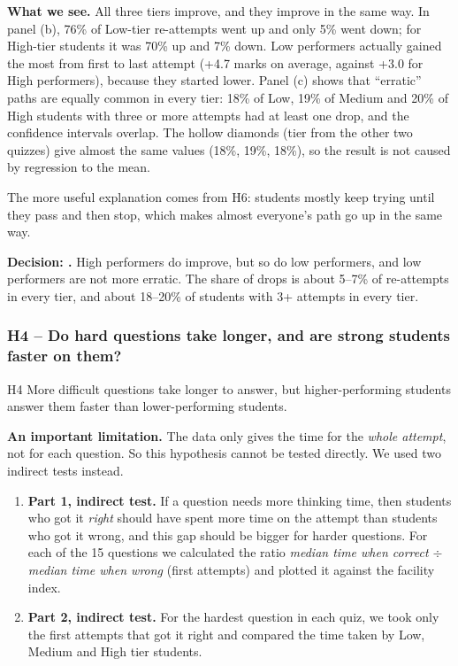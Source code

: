 \textbf{What we see.} All three tiers improve, and they improve in the same
way. In panel (b), 76\% of Low-tier re-attempts went up and only 5\% went down;
for High-tier students it was 70\% up and 7\% down. Low performers actually
gained the most from first to last attempt (+4.7 marks on average, against
+3.0 for High performers), because they started lower. Panel (c) shows that
``erratic'' paths are equally common in every tier: 18\% of Low, 19\% of Medium
and 20\% of High students with three or more attempts had at least one drop,
and the confidence intervals overlap. The hollow diamonds (tier from the other
two quizzes) give almost the same values (18\%, 19\%, 18\%), so the result is
not caused by regression to the mean.

The more useful explanation comes from H6: students mostly keep trying until
they pass and then stop, which makes almost everyone's path go up in the same
way.

\begin{decision}
\textbf{Decision: \rejected.} High performers do improve, but so do low
performers, and low performers are not more erratic. The share of drops is
about 5--7\% of re-attempts in every tier, and about 18--20\% of students with
3+ attempts in every tier.
\end{decision}

\subsubsection{H4 -- Do hard questions take longer, and are strong students faster on them?}
\label{sec:h4}

\begin{hyp}{H4}
More difficult questions take longer to answer, but higher-performing students
answer them faster than lower-performing students.
\end{hyp}

\textbf{An important limitation.} The data only gives the time for the
\emph{whole attempt}, not for each question. So this hypothesis cannot be
tested directly. We used two indirect tests instead.

\begin{enumerate}
  \item \textbf{Part 1, indirect test.} If a question needs more thinking time,
        then students who got it \emph{right} should have spent more time on the
        attempt than students who got it wrong, and this gap should be bigger
        for harder questions. For each of the 15 questions we calculated the
        ratio \emph{median time when correct $\div$ median time when wrong}
        (first attempts) and plotted it against the facility index.
  \item \textbf{Part 2, indirect test.} For the hardest question in each quiz,
        we took only the first attempts that got it right and compared the time
        taken by Low, Medium and High tier students.
\end{enumerate}

